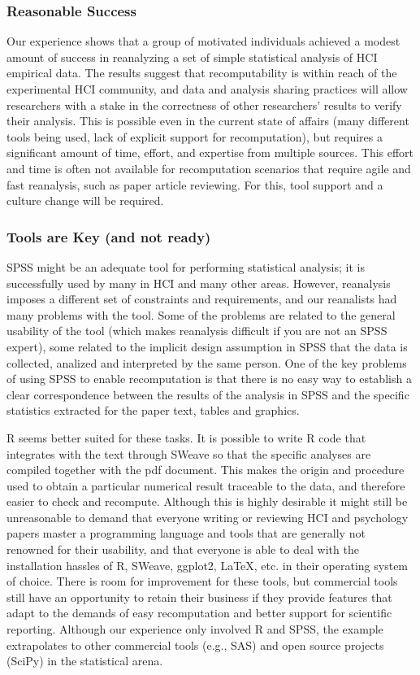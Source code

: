 \subsubsection{Reasonable Success}
Our experience shows that a group of motivated individuals achieved a modest amount of success in reanalyzing a set of simple statistical analysis of HCI empirical data. The results suggest that recomputability is within reach of the experimental HCI community, and data and analysis sharing practices will allow researchers with a stake in the correctness of other researchers' results to verify their analysis. This is possible even in the current state of affairs (many different tools being used, lack of explicit support for recomputation), but requires a significant amount of time, effort, and expertise from multiple sources. This effort and time is often not available for recomputation scenarios that require agile and fast reanalysis, such as paper article reviewing. For this, tool support and a culture change will be required. 

\subsubsection{Tools are Key (and not ready)}
SPSS might be an adequate tool for performing statistical analysis; it is successfully used by many in HCI and many other areas. However, reanalysis imposes a different set of constraints and requirements, and our reanalists had many problems with the tool. Some of the problems are related to the general usability of the tool (which makes reanalysis difficult if you are not an SPSS expert), some related to the implicit design assumption in SPSS that the data is collected, analized and interpreted by the same person. One of the key problems of using SPSS to enable recomputation is that there is no easy way to establish a clear correspondence between the results of the analysis in SPSS and the specific statistics extracted for the paper text, tables and graphics. 

R seems better suited for these tasks. It is possible to write R code that integrates with the text through SWeave \cite{lmucs-papers:Leisch:2002} so that the specific analyses are compiled together with the pdf document. This makes the origin and procedure used to obtain a particular numerical result traceable to the data, and therefore easier to check and recompute. Although this is highly desirable it might still be unreasonable to demand that everyone writing or reviewing HCI and psychology papers master a programming language and tools that are generally not renowned for their usability, and that everyone is able to deal with the installation hassles of R, SWeave, ggplot2, LaTeX, etc. in their operating system of choice. There is room for improvement for these tools, but commercial tools still have an opportunity to retain their business if they provide features that adapt to the demands of easy recomputation and better support for scientific reporting. Although our experience only involved R and SPSS, the example extrapolates to other commercial tools (e.g., SAS) and open source projects (SciPy) in the statistical arena.

